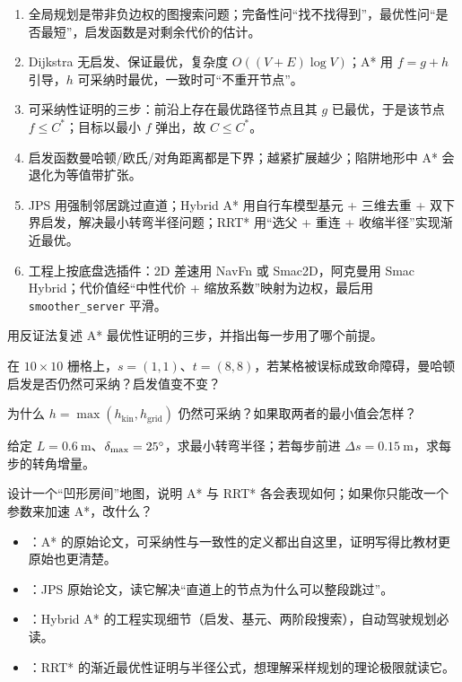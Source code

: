 \begin{summary}

\begin{enumerate}
  \item 全局规划是带非负边权的图搜索问题；完备性问“找不找得到”，最优性问“是否最短”，启发函数是对剩余代价的估计。
  \item Dijkstra 无启发、保证最优，复杂度 $O((V+E)\log V)$；A* 用 $f=g+h$ 引导，$h$ 可采纳时最优，一致时可“不重开节点”。
  \item 可采纳性证明的三步：前沿上存在最优路径节点且其 $g$ 已最优，于是该节点 $f\le C^*$；目标以最小 $f$ 弹出，故 $C\le C^*$。
  \item 启发函数曼哈顿/欧氏/对角距离都是下界；越紧扩展越少；陷阱地形中 A* 会退化为等值带扩张。
  \item JPS 用强制邻居跳过直道；Hybrid A* 用自行车模型基元 + 三维去重 + 双下界启发，解决最小转弯半径问题；RRT* 用“选父 + 重连 + 收缩半径”实现渐近最优。
  \item 工程上按底盘选插件：2D 差速用 NavFn 或 Smac2D，阿克曼用 Smac Hybrid；代价值经“中性代价 + 缩放系数”映射为边权，最后用 \texttt{smoother\_server} 平滑。
\end{enumerate}


\end{summary}

\begin{problemset}

  \item 用反证法复述 A* 最优性证明的三步，并指出每一步用了哪个前提。
  \item 在 $10\times10$ 栅格上，$s=(1,1)$、$t=(8,8)$，若某格被误标成致命障碍，曼哈顿启发是否仍然可采纳？启发值变不变？
  \item 为什么 $h=\max(h_{\mathrm{kin}},h_{\mathrm{grid}})$ 仍然可采纳？如果取两者的最小值会怎样？
  \item 给定 $L=0.6\ \mathrm{m}$、$\delta_{\max}=25^\circ$，求最小转弯半径；若每步前进 $\Delta s=0.15\ \mathrm{m}$，求每步的转角增量。
  \item 设计一个“凹形房间”地图，说明 A* 与 RRT* 各会表现如何；如果你只能改一个参数来加速 A*，改什么？
\end{problemset}

\begin{reading}

\begin{itemize}
  \item \cite{hart1968astar}：A* 的原始论文，可采纳性与一致性的定义都出自这里，证明写得比教材更原始也更清楚。
  \item \cite{harabor2011jps}：JPS 原始论文，读它解决“直道上的节点为什么可以整段跳过”。
  \item \cite{dolgov2010hybridastar}：Hybrid A* 的工程实现细节（启发、基元、两阶段搜索），自动驾驶规划必读。
  \item \cite{karaman2011rrtstar}：RRT* 的渐近最优性证明与半径公式，想理解采样规划的理论极限就读它。
\end{itemize}


\end{reading}
